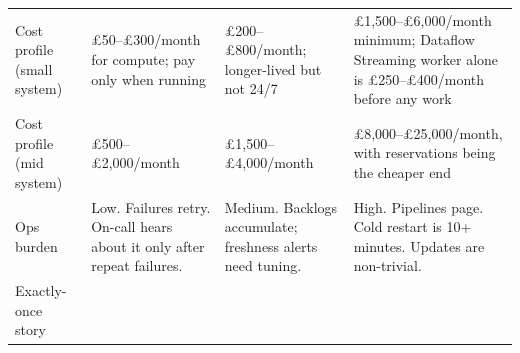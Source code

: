 \documentclass[
  11pt,
  british,
  oneside]{book}
\begin{document}
\begin{longtable}[]{@{}llll@{}}
\begin{minipage}[t]{0.22\columnwidth}\raggedright
Cost profile (small system)\strut
\end{minipage} & \begin{minipage}[t]{0.22\columnwidth}\raggedright
£50--£300/month for compute; pay only when running\strut
\end{minipage} & \begin{minipage}[t]{0.22\columnwidth}\raggedright
£200--£800/month; longer-lived but not 24/7\strut
\end{minipage} & \begin{minipage}[t]{0.22\columnwidth}\raggedright
£1,500--£6,000/month minimum; Dataflow Streaming worker alone is
£250--£400/month before any work\strut
\end{minipage}\tabularnewline
\begin{minipage}[t]{0.22\columnwidth}\raggedright
Cost profile (mid system)\strut
\end{minipage} & \begin{minipage}[t]{0.22\columnwidth}\raggedright
£500--£2,000/month\strut
\end{minipage} & \begin{minipage}[t]{0.22\columnwidth}\raggedright
£1,500--£4,000/month\strut
\end{minipage} & \begin{minipage}[t]{0.22\columnwidth}\raggedright
£8,000--£25,000/month, with reservations being the cheaper end\strut
\end{minipage}\tabularnewline
\begin{minipage}[t]{0.22\columnwidth}\raggedright
Ops burden\strut
\end{minipage} & \begin{minipage}[t]{0.22\columnwidth}\raggedright
Low. Failures retry. On-call hears about it only after repeat
failures.\strut
\end{minipage} & \begin{minipage}[t]{0.22\columnwidth}\raggedright
Medium. Backlogs accumulate; freshness alerts need tuning.\strut
\end{minipage} & \begin{minipage}[t]{0.22\columnwidth}\raggedright
High. Pipelines page. Cold restart is 10+ minutes. Updates are
non-trivial.\strut
\end{minipage}\tabularnewline
\begin{minipage}[t]{0.22\columnwidth}\raggedright
Exactly-once story\strut
\end{minipage} & \begin{minipage}[t]{0.22\columnwidth}\raggedright

\end{minipage}
\end{longtable}
\end{document}
